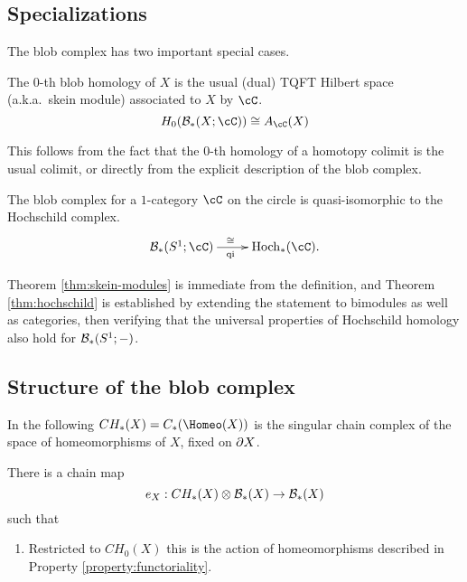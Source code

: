 \documentclass{pnastwo}
\begin{document}
\begin{article}
\subsection{Specializations}
\label{sec:specializations}

The blob complex has two important special cases.

\begin{thm}
\label{thm:skein-modules}
The $0$-th blob homology of $X$ is the usual 
(dual) TQFT Hilbert space (a.k.a.\ skein module) associated to $X$
by $\cC$.
\begin{equation*}
H_0(\bc_*(X;\cC)) \iso A_{\cC}(X)
\end{equation*}
\end{thm}
This follows from the fact that the $0$-th homology of a homotopy colimit is the usual colimit, or directly from the explicit description of the blob complex.

\begin{thm}[Hochschild homology when $X=S^1$]
\label{thm:hochschild}
The blob complex for a $1$-category $\cC$ on the circle is
quasi-isomorphic to the Hochschild complex.
\begin{equation*}
\xymatrix{\bc_*(S^1;\cC) \ar[r]^(0.47){\iso}_(0.47){\text{qi}} & \HC_*(\cC).}
\end{equation*}
\end{thm}

Theorem \ref{thm:skein-modules} is immediate from the definition, and
Theorem \ref{thm:hochschild} is established by extending the statement to bimodules as well as categories, then verifying that the universal properties of Hochschild homology also hold for ${\mathcal B}_*(S^1; -)$.


\subsection{Structure of the blob complex}
\label{sec:structure}

In the following $\CH{X} = C_*(\Homeo(X))$ is the singular chain complex of the space of homeomorphisms of $X$, fixed on $\partial X$.

\begin{thm}
\label{thm:CH}\label{thm:evaluation}
There is a chain map
\begin{equation*}
e_X: CH_*(X) \otimes {\mathcal B}_*(X) \to {\mathcal B}_*(X)
\end{equation*}
such that
\begin{enumerate}
\item Restricted to $CH_0(X)$ this is the action of homeomorphisms described in Property \ref{property:functoriality}. 


\end{enumerate}
\end{thm}
\end{article}
\end{document}
